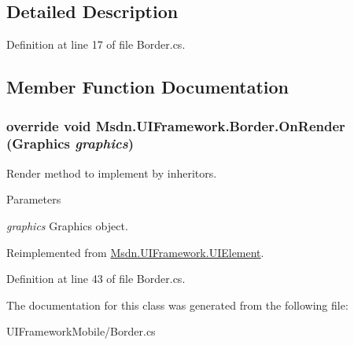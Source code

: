 \subsection{Detailed Description}


Definition at line 17 of file Border.cs.

\subsection{Member Function Documentation}
\hypertarget{class_msdn_1_1_u_i_framework_1_1_border_a69a519c3ec33e09fc09de0e6100414fe}{
\subsubsection[{OnRender}]{\setlength{\rightskip}{0pt plus 5cm}override void Msdn.UIFramework.Border.OnRender (Graphics {\em graphics})}}
\label{class_msdn_1_1_u_i_framework_1_1_border_a69a519c3ec33e09fc09de0e6100414fe}


Render method to implement by inheritors. 
\begin{DoxyParams}{Parameters}
\item[{\em graphics}]Graphics object.\end{DoxyParams}


Reimplemented from \hyperlink{class_msdn_1_1_u_i_framework_1_1_u_i_element_a20b2245806231553935896fe7731812b}{Msdn.UIFramework.UIElement}.

Definition at line 43 of file Border.cs.

The documentation for this class was generated from the following file:\begin{DoxyCompactItemize}
\item 
UIFrameworkMobile/Border.cs\end{DoxyCompactItemize}
